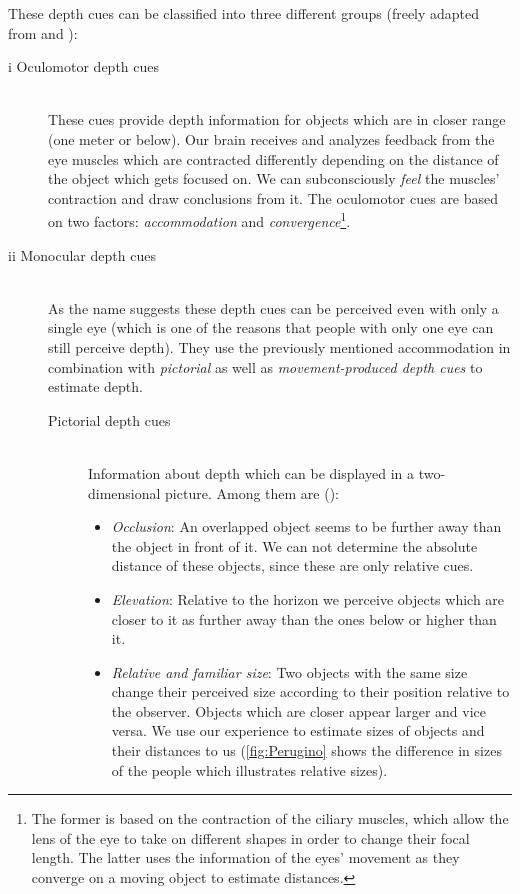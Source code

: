 These depth cues can be classified into three different groups (freely adapted from \cite[p.226 et seqq.]{Goldstein.2015} and \cite[p.28 et seqq.]{Hottong.2009}):
\begin{description}
\item [i Oculomotor depth cues]\hfill \\ These cues provide depth information for objects which are in closer range (one meter or below). Our brain receives and analyzes feedback from the eye muscles which are contracted differently depending on the distance of the object which gets focused on. We can subconsciously \textit{feel} the muscles' contraction and draw conclusions from it. The oculomotor cues are based on two factors: \textit{accommodation} and \textit{convergence}\footnote{The former is based on the contraction of the ciliary muscles, which allow the lens of the eye to take on different shapes in order to change their focal length. The latter uses the information of the eyes' movement as they converge on a moving object to estimate distances.}.
\item [ii Monocular depth cues]\hfill \\ As the name suggests these depth cues can be perceived even with only a single eye (which is one of the reasons that people with only one eye can still perceive depth). They use the previously mentioned accommodation in combination with \textit{pictorial} as well as \textit{movement-produced depth cues} to estimate depth.
	\begin{description}
	\item [Pictorial depth cues]\hfill \\ Information about depth which can be displayed in a two-dimensional picture. Among them are (\cite[p.227 et seqq.]{Goldstein.2015}):
		\begin{itemize}
		\item \textit{Occlusion}: An overlapped object seems to be further away than the object in front of it. We can not determine the absolute distance of these objects, since these are only relative cues.
		\item \textit{Elevation}: Relative to the horizon we perceive objects which are closer to it as further away than the ones below or higher than it. 		
		\item \textit{Relative and familiar size}: Two objects with the same size change their perceived size according to their position relative to the observer. Objects which are closer appear larger and vice versa. We use our experience to estimate sizes of objects and their distances to us (\autoref{fig:Perugino} shows the difference in sizes of the people which illustrates relative sizes).

\end{itemize}
\end{description}
\end{description}
